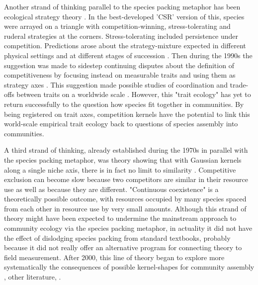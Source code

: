 \documentclass[a4paper,11pt]{article}
\begin{document}
Another strand of thinking parallel to the species packing metaphor has been ecological strategy theory 
\citep[e.g.][]{Grime-1974, Grime-1977, Grime-1979, Grime-1988, Southwood-1977, 
Greenslade-1983}. In the best-developed 'CSR' version of this, species were arrayed on a triangle with competition-winning, stress-tolerating and ruderal strategies at the corners. Stress-tolerating included persistence under competition. Predictions arose about the strategy-mixture expected in different physical settings and at different stages of succession \citep{Grime-1979,Grime-2001}. Then during the 1990s the suggestion was made to sidestep continuing disputes about the definition of competitiveness by focusing instead on measurable traits and using them as strategy axes \citep{Westoby-1998, Weiher-1999, Westoby-2002}. This suggestion made possible studies of coordination and trade-offs between traits on a worldwide scale \citep[e.g.][]{Wright-2004, Zanne-2010, Cornwell-2014}. However, this "trait ecology" has yet to return successfully to the question how species fit together in communities. By being registered on trait axes, competition kernels have the potential to link this world-scale empirical trait ecology back to questions of species assembly into communities.

A third strand of thinking, already established during the 1970s in parallel with the species packing metaphor, was theory showing that with Gaussian kernels along a single niche axis, there is in fact no limit to similarity \citep{May-1972, Abrams-1975, Abrams-1983}. Competitive exclusion can become slow because two competitors are similar in their resource use as well as because they are different. "Continuous coexistence" is a theoretically possible outcome, with resources occupied by many species spaced from each other in resource use by very small amounts. Although this strand of theory might have been expected to undermine the mainstream approach to community ecology via the species packing metaphor, in actuality it did not have the effect of dislodging species packing from standard textbooks, probably because it did not really offer an alternative program for connecting theory to field measurement.  After 2000, this line of theory began to explore more systematically the consequences of possible kernel-shapes for community assembly \citep{Scheffer-2006}, other literature, \citep{Leimar-2013}.
\end{document}
